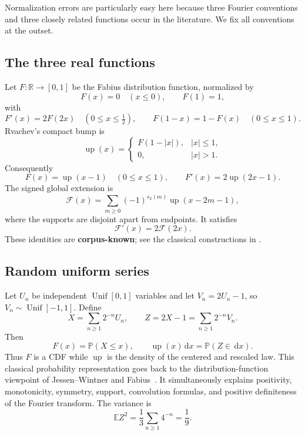 \documentclass[11pt,oneside]{article}
\theoremstyle{definition}
\newcommand{\dd}{\,\mathrm d}
\newcommand{\E}{\mathbb E}
\newcommand{\Pp}{\mathbb P}
\newcommand{\R}{\mathbb R}
\newcommand{\Up}{\operatorname{up}}
\newcommand{\wt}{s_2}
\newcommand{\CorpusKnown}{\textcolor{linkblue}{\textbf{corpus-known}}}
\begin{document}
Normalization errors are particularly easy here because three Fourier conventions and
three closely related functions occur in the literature.  We fix all conventions at
the outset.

\subsection{The three real functions}

Let \(F\colon\R\to[0,1]\) be the Fabius distribution function, normalized by
\[
 F(x)=0\quad(x\le0),\qquad F(1)=1,
\]
with
\begin{equation}
 F'(x)=2F(2x)\quad(0\le x\le\tfrac12),
 \qquad F(1-x)=1-F(x)\quad(0\le x\le1).
 \label{eq:F-basic}
\end{equation}
Rvachev's compact bump is
\begin{equation}
 \Up(x)=
 \begin{cases}
 F(1-|x|),& |x|\le1,\\
 0,& |x|>1.
 \end{cases}
 \label{eq:up-fold}
\end{equation}
Consequently
\begin{equation}
 F(x)=\Up(x-1)\quad(0\le x\le1),
 \qquad
 F'(x)=2\Up(2x-1).
 \label{eq:F-up}
\end{equation}
The signed global extension is
\begin{equation}
 \mathcal F(x)=\sum_{m\ge0}(-1)^{\wt(m)}\Up(x-2m-1),
 \label{eq:signed-extension}
\end{equation}
where the supports are disjoint apart from endpoints.  It satisfies
\begin{equation}
 \mathcal F'(x)=2\mathcal F(2x).
 \label{eq:global-selfdiff}
\end{equation}
These identities are \CorpusKnown{}; see the classical constructions in
\cite{Fabius1966,Arias1982,Rvachev1990}.

\subsection{Random uniform series}

Let \(U_n\) be independent \(\operatorname{Unif}[0,1]\) variables and let
\(V_n=2U_n-1\), so \(V_n\sim\operatorname{Unif}[-1,1]\).  Define
\begin{equation}
 X=\sum_{n\ge1}2^{-n}U_n,
 \qquad
 Z=2X-1=\sum_{n\ge1}2^{-n}V_n.
 \label{eq:random-series}
\end{equation}
Then
\begin{equation}
 F(x)=\Pp(X\le x),\qquad \Up(x)\dd x=\Pp(Z\in\dd x).
 \label{eq:cdf-density}
\end{equation}
Thus \(F\) is a CDF while \(\Up\) is the density of the centered and rescaled law.
This classical probability representation goes back to the distribution-function viewpoint of
Jessen--Wintner and Fabius~\cite{JessenWintner1935,Fabius1966}.  It simultaneously explains positivity, monotonicity, symmetry,
support, convolution formulas, and positive definiteness of the Fourier transform.
The variance is
\begin{equation}
 \E Z^2=\frac13\sum_{n\ge1}4^{-n}=\frac19.
 \label{eq:variance}
\end{equation}
\end{document}
